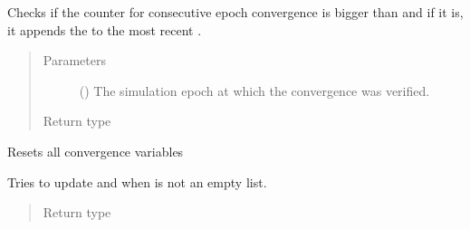 \documentclass[letterpaper,10pt,english]{sphinxmanual}
\begin{document}
\begin{fulllineitems}
\begin{fulllineitems}
Checks if the counter for consecutive epoch convergence is bigger
than {\hyperref[\detokenize{app:app.environment_settings.MIN_CONVERGENCE_THRESHOLD}]{}}
and if it is, it appends the  to the most recent
{\hyperref[\detokenize{app.domain.helpers:app.domain.helpers.smart_dataclasses.LoggingData.convergence_set}]{}}.
\begin{quote}\begin{description}
\item[{Parameters}] \leavevmode
{} () \textendash{} The simulation epoch at which the convergence was verified.

\item[{Return type}] \leavevmode
{}

\end{description}\end{quote}

\end{fulllineitems}


\begin{fulllineitems}
\label{\detokenize{app.domain.helpers:app.domain.helpers.smart_dataclasses.LoggingData.save_sets_and_reset}}
Resets all convergence variables

Tries to update {\hyperref[\detokenize{app.domain.helpers:app.domain.helpers.smart_dataclasses.LoggingData.largest_convergence_window}]{}} and
{\hyperref[\detokenize{app.domain.helpers:app.domain.helpers.smart_dataclasses.LoggingData.convergence_sets}]{}} when {\hyperref[\detokenize{app.domain.helpers:app.domain.helpers.smart_dataclasses.LoggingData.convergence_set}]{}}
is not an empty list.
\begin{quote}\begin{description}
\item[{Return type}] \leavevmode
{}

\end{description}\end{quote}

\end{fulllineitems}


\end{fulllineitems}
\end{document}
